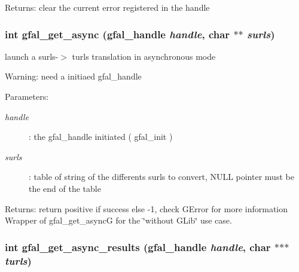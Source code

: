 \begin{Desc}
\item[Returns:]clear the current error registered in the handle \end{Desc}
\subsubsection{\setlength{\rightskip}{0pt plus 5cm}int gfal\_\-get\_\-async (gfal\_\-handle {\em handle}, char $\ast$$\ast$ {\em surls})}\label{gfal__common__interface_8h_68ef05f37b4971c8306b1cc6ee529647}


launch a surls-$>$ turls translation in asynchronous mode 

\begin{Desc}
\item[Warning:]need a initiaed gfal\_\-handle \end{Desc}
\begin{Desc}
\item[Parameters:]
\begin{description}
\item[{\em handle}]: the gfal\_\-handle initiated ( gfal\_\-init ) \item[{\em surls}]: table of string of the differents surls to convert, NULL pointer must be the end of the table \end{description}
\end{Desc}
\begin{Desc}
\item[Returns:]return positive if success else -1, check GError for more information Wrapper of gfal\_\-get\_\-async\-G for the \char`\"{}without GLib\char`\"{} use case. \end{Desc}
\subsubsection{\setlength{\rightskip}{0pt plus 5cm}int gfal\_\-get\_\-async\_\-results (gfal\_\-handle {\em handle}, char $\ast$$\ast$$\ast$ {\em turls})}\label{gfal__common__interface_8h_0c654545b837b8e1928842ee762ce5e9}


